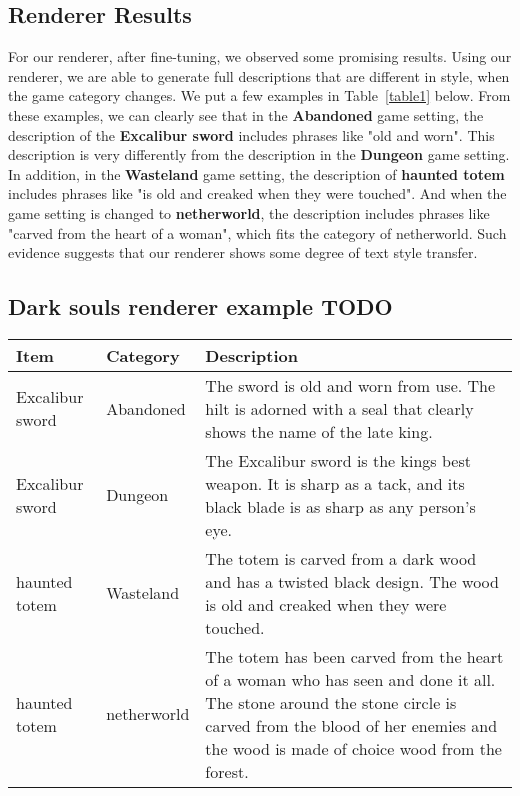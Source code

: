 \documentclass[11pt]{article}
\begin{document}
\subsection{Renderer Results}
For our renderer, after fine-tuning, we observed some promising results. Using our renderer, we are able to generate full descriptions that are different in style, when the game category changes. We put a few examples in Table~\ref{table1} below. From these examples, we can clearly see that in the \textbf{Abandoned} game setting, the description of the \textbf{Excalibur sword} includes phrases like "old and worn". This description is very differently from the description in the \textbf{Dungeon} game setting. In addition, in the \textbf{Wasteland} game setting, the description of \textbf{haunted totem} includes phrases like "is old and creaked when they were touched". And when the game setting is changed to \textbf{netherworld}, the description 
includes phrases like "carved from the heart of a
woman", which fits the category of netherworld. Such evidence suggests that our renderer shows some degree of text style transfer. 

\subsection{Dark souls renderer example TODO}

\begin{table*}
\centering
\begin{tabular}{ll|p{75mm}}
\hline
\textbf{Item} & \textbf{Category} & \textbf{Description}\\
\hline
Excalibur sword & Abandoned & The sword is old and worn from use. The hilt is adorned with a seal that clearly shows the name of the late king. \\
Excalibur sword & Dungeon & The Excalibur sword is the kings best weapon. It is sharp as a tack, and its black blade is as sharp as any person's eye.\\
haunted totem & Wasteland & The totem is carved from a dark wood and has a twisted black design. The wood is old and creaked when they were touched.\\
haunted totem & netherworld & The totem has been carved from the heart of a woman who has seen and done it all. The stone around the stone circle is carved from the blood of her enemies and the wood is made of choice wood from the forest.\\
\hline
\end{tabular}
\caption{\label{table1}
Examples of generated descriptions of the same item in different game settings.
}
\end{table*}
\end{document}
